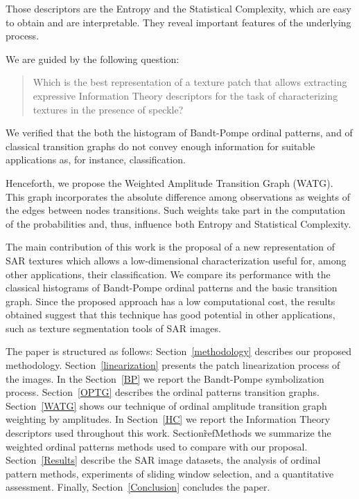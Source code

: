\documentclass[journal]{IEEEtran}
\begin{document}
	Those descriptors are the Entropy and the Statistical Complexity, which are easy to obtain and are interpretable.
	They reveal important features of the underlying process.
	
	We are guided by the following question:
	\begin{quote}
		Which is the best representation of a texture patch that allows extracting expressive Information Theory descriptors for the task of characterizing textures in the presence of speckle?
	\end{quote}
	We verified that the both the histogram of Bandt-Pompe ordinal patterns, and of classical transition graphs do not convey enough information for suitable applications as, for instance, classification.
	
	Henceforth, we propose the Weighted Amplitude Transition Graph (WATG).
	This graph incorporates the absolute difference among observations as weights of the edges between nodes transitions.
	Such weights take part in the computation of the probabilities and, thus, influence both Entropy and Statistical Complexity.
	
	The main contribution of this work is the proposal of a new representation of SAR textures which allows a low-dimensional characterization useful for, among other applications, their classification.
	We compare its performance with the classical histograms of Bandt-Pompe ordinal patterns and the basic transition graph.
	Since the proposed approach has a low computational cost, the results obtained suggest that this technique has good potential in other applications, such as texture segmentation tools of SAR images.
	
	The paper is structured as follows:
	Section~\ref{methodology} describes our proposed methodology.
	Section~\ref{linearization} presents the patch linearization process of the images.
	In the Section~\ref{BP} we report the Bandt-Pompe symbolization process.
	Section~\ref{OPTG} describes the ordinal patterns transition graphs.
	Section~\ref{WATG} shows our technique of ordinal amplitude transition graph weighting by amplitudes.
	In Section~\ref{HC} we report the Information Theory descriptors used throughout this work.
	Section\~ref{Methods} we summarize the weighted ordinal patterns methods used to compare with our proposal.
	Section~\ref{Results} describe the SAR image datasets, 
	the analysis of ordinal pattern methods, 
	experiments of sliding window selection, 
	and a quantitative assessment.
	Finally, Section~\ref{Conclusion} concludes the paper.
	
\end{document}
